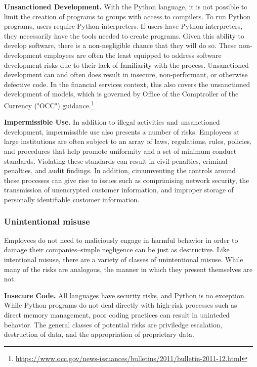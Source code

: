                                                 \textbf{Unsanctioned Development.}
                                                With the Python language, it is not possible to limit the creation of programs to groups with access to compilers. To run Python programs, users require Python interpreters. If users have Python interpreters, they necessarily have the tools needed to create programs. Given this ability to develop software, there is a non-negligible chance that they will do so. These non-development employees are often the least equipped to address software development risks due to their lack of familiarity with the process. Unsanctioned development can and often does result in insecure, non-performant, or otherwise defective code. In the financial services context, this also covers the unsanctioned development of models, which is governed by Office of the Comptroller of the Currency ("OCC") guidance.\footnote{\url{https://www.occ.gov/news-issuances/bulletins/2011/bulletin-2011-12.html}}
 
                                                \textbf{Impermissible Use.}
                                                In addition to illegal activities and unsanctioned development, impermissible use also presents a number of risks. Employees at large institutions are often subject to an array of laws, regulations, rules, policies, and procedures that help promote uniformity and a set of minimum conduct standards. Violating these standards can result in civil penalties, criminal penalties, and audit findings. In addition, circumventing the controls around these processes can give rise to issues such as comprimising network security, the transmission of unencrypted customer information, and improper storage of personally identifiable customer information.
 
                                \subsubsection{Unintentional misuse}
 
                                                Employees do not need to maliciously engage in harmful behavior in order to damage their companies--simple negligence can be just as destructive. Like intentional misuse, there are a variety of classes of unintentional misuse. While many of the risks are analogous, the manner in which they present themselves are not.
 
                                                \textbf{Insecure Code.}
                                                All languages have security risks, and Python is no exception. While Python programs do not deal directly with high-risk processes such as direct memory management, poor coding practices can result in uninteded behavior. The general classes of potential risks are priviledge escalation, destruction of data, and the appropriation of proprietary data.
                                               
